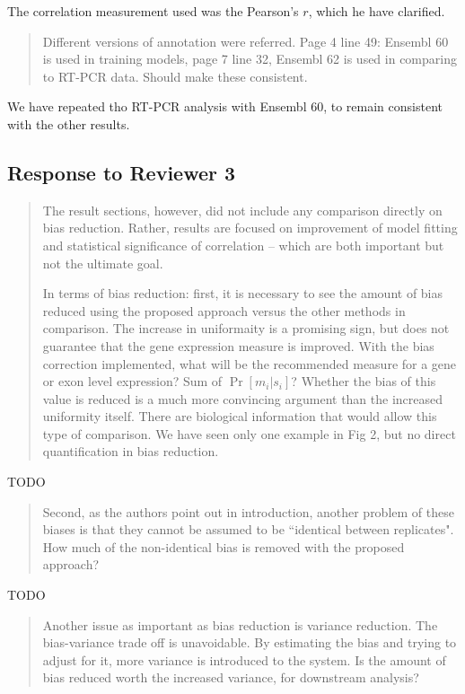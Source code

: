 \documentclass{article}
\begin{document}
The correlation measurement used was the Pearson's $r$, which he have clarified.


\begin{quote}
Different versions of annotation were referred. Page 4 line 49: Ensembl 60 is
used in training models, page 7 line 32, Ensembl 62 is used in comparing to
RT-PCR data. Should make these consistent.
\end{quote}

We have repeated tho RT-PCR analysis with Ensembl 60, to remain consistent with
the other results.


\subsection*{Response to Reviewer 3}


\begin{quote}
The result sections, however, did not include any comparison directly
on bias reduction. Rather, results are focused on improvement of model
fitting and statistical significance of correlation -- which are both
important but not the ultimate goal.

In terms of bias reduction: first, it is necessary to see the amount of bias
reduced using the proposed approach versus the other methods in
comparison.  The increase in uniformaity is a promising sign, but does
not guarantee that the gene expression measure is improved.  With the
bias correction implemented, what will be the recommended measure for
a gene or exon level expression? Sum of $\Pr[m_i|s_i]$? Whether the bias of
this value is reduced is a much more convincing argument than the
increased uniformity itself. There are  biological information that
would allow this type of comparison. We have seen only one example in
Fig 2, but no direct quantification in bias reduction.
\end{quote}

TODO


\begin{quote}
Second, as the authors point out in introduction, another problem of
these biases is that they cannot be assumed to be ``identical between
replicates". How much of the non-identical bias is removed with the
proposed approach?
\end{quote}

TODO

\begin{quote}
Another issue as important as bias reduction is variance reduction. The
bias-variance trade off is unavoidable. By estimating the bias and trying to
adjust for it, more variance is introduced to the system. Is the amount of bias
reduced worth the increased variance, for downstream analysis?
\end{quote}
\end{document}
